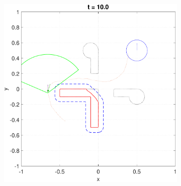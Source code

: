 \begin{figure}
\begin{subfigure}[t]{0.49\columnwidth}
    \includegraphics[width=\columnwidth]{fig/P5D_Dubins/101}
    \caption{}
  \end{subfigure}  


\end{figure}
